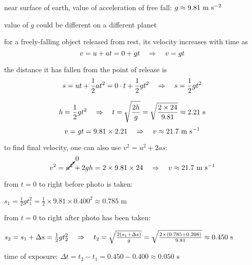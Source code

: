 \cmt near surface of earth, value of acceleration of free fall: $g\approx9.81\text{ m s$^{-2}$}$

value of $g$ could be different on a different planet

\cmt for a freely-falling object released from rest, its velocity increases with time as
\begin{equation*}
	v=u+at = 0 + gt \quad \Rightarrow \quad v = gt
\end{equation*}

the distance it has fallen from the point of release is
\begin{equation*}
s=ut+\frac{1}{2} at^2 = 0\cdot t + \frac{1}{2}gt^2 \quad \Rightarrow \quad s=\frac{1}{2}gt^2
\end{equation*}

\begin{soln}
\begin{equation*}
h = \frac{1}{2}gt^2 \quad \Rightarrow \quad t = \sqrt{\frac{2h}{g}} = \sqrt{\frac{2\times24}{9.81}} \approx 2.21 \text{ s}
\end{equation*}
\begin{equation*}
v = gt = 9.81 \times 2.21 \quad \Rightarrow \quad v \approx 21.7 \text{ m s$^{-1}$}
\end{equation*}

to find final velocity, one can also use $v^2 = u^2 + 2as$:
\begin{equation*}
v^2 = \cancelto{0}{u^2} + 2gh = 2\times9.81\times24 \quad \Rightarrow \quad v \approx 21.7 \text{ m s$^{-1}$} 
\end{equation*}
\end{soln}


\begin{soln} from $t=0$ to right before photo is taken: 
{	\centering
	
	$s_1 = \frac{1}{2}gt_1^2 = \frac{1}{2}\times9.81\times0.400^2 \approx 0.785 \text{ m}$
	
}

from $t=0$ to right after photo has been taken: 

{
	\centering
	
	$s_2 = s_1 + \Delta s = \frac{1}{2}gt^2_2 \quad \Rightarrow \quad t_2 = \sqrt{\frac{2(s_1+\Delta s)}{g}} = \sqrt{\frac{2\times(0.785+0.208)}{9.81}} \approx 0.450 \text{ s}$
	
}

time of exposure: $\Delta t = t_2 - t_1 = 0.450 - 0.400 \approx 0.050 \text{ s}$ 
\end{soln}


